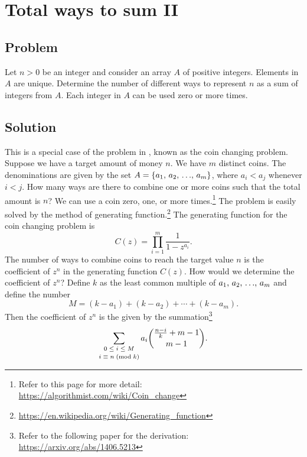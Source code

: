 
\section{Total ways to sum II}



\subsection*{Problem}

Let $n > 0$ be an integer and consider an array $A$ of positive
integers.  Elements in $A$ are unique.  Determine the number of
different ways to represent $n$ as a sum of integers from $A$.  Each
integer in $A$ can be used zero or more times.



\subsection*{Solution}

This is a special case of the problem
in , known as the coin changing
problem.  Suppose we have a target amount of money $n$.  We have $m$
distinct coins.  The denominations are given by the set
$A = \left\{{{a}_1},\, {{a}_2},\, {\dots},\, {{a}_{m}}\right\}$, where $a_i < a_j$ whenever $i < j$.  How many
ways are there to combine one or more coins such that the total amount
is $n$?  We can use a coin zero, one, or more times.\footnote{
  Refer to this page for more detail:
  \url{https://algorithmist.com/wiki/Coin_change}
}
The problem is easily solved by the method of generating
function.\footnote{
  \url{https://en.wikipedia.org/wiki/Generating_function}
}
The generating function for the coin changing problem is
\[
C(z)
=
\prod_{i=1}^{m}
\frac{
  1
}{
  1 - z^{a_i}
}.
\]
The number of ways to combine coins to reach the target value $n$ is
the coefficient of $z^n$ in the generating function $C(z)$.  How would
we determine the coefficient of $z^n$?  Define $k$ as the least common
multiple of ${{a}_1},\, {{a}_2},\, {\dots},\, {{a}_{m}}$ and define the number
\[
M
=
(k - a_1)
+
(k - a_2)
+
\cdots
+
(k - a_m).
\]
Then the coefficient of $z^n$ is the given by the summation\footnote{
  Refer to the following paper for the derivation:
  \url{https://arxiv.org/abs/1406.5213}
}
\[
\sum_{\substack{0 \; \leq \; i \; \leq \; M\\[2pt] {i} \; \equiv \; {n} \; (\text{mod}\; {k})}}
a_i
\binom{
  \frac{n-i}{k} + m - 1
}{
  m - 1
}.
\]


